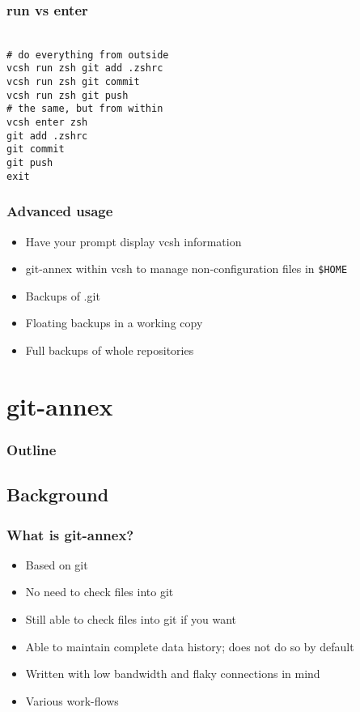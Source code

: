 \documentclass[t]{beamer}
\begin{document}
\begin{frame}
	\frametitle{run vs enter}
	\texttt{ \\
		\# do everything from outside \\
		vcsh run zsh git add .zshrc \\
		vcsh run zsh git commit \\
		vcsh run zsh git push \\
		\# the same, but from within\\
		vcsh enter zsh \\
		git add .zshrc \\
		git commit \\
		git push \\
		exit
	}
\end{frame}

\begin{frame}
	\frametitle{Advanced usage}
	\begin{itemize}
		\item Have your prompt display vcsh information
		\item git-annex within vcsh to manage non-configuration files in \texttt{\$HOME}
		\item Backups of .git
		\item Floating backups in a working copy
		\item Full backups of whole repositories
	\end{itemize}
\end{frame}


\section{git-annex}

\begin{frame}
	\frametitle{Outline}
	\tableofcontents[currentsection]
\end{frame}

\subsection{Background}

\begin{frame}
	\frametitle{What is git-annex?}
	\begin{itemize}
		\item Based on git
		\item No need to check files into git
		\item Still able to check files into git if you want
		\item Able to maintain complete data history; does not do so by default
		\item Written with low bandwidth and flaky connections in mind
		\item Various work-flows
	\end{itemize}
\end{frame}
\end{document}
